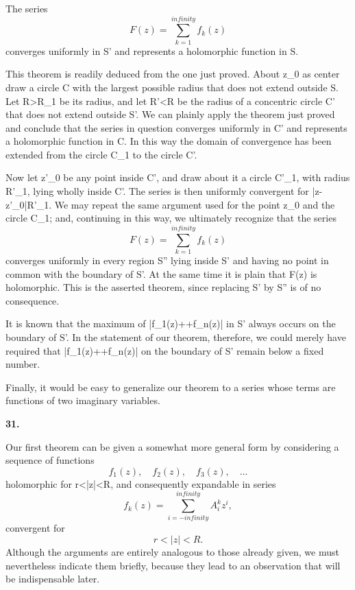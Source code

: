 \documentclass[
  paper=b5,
  fontsize=13pt,
  twoside,
  headings=normal,
  bookmarkpackage=false
]{scrartcl}
\theoremstyle{stieltjesplain}
\theoremstyle{stieltjesdefinition}
\def\({}\def\){}%
\def\infty{infinity}%
\newcommand{\origsection}[1]{%
  \par\addvspace{0.85\baselineskip}%
  \phantomsection\label{sec:#1}%
  \addcontentsline{toc}{subsection}{\texorpdfstring{\S~#1}{Section #1}}%
  \noindent\textbf{#1.}\quad\ignorespaces
}
\begin{document}
\begin{theorem}
The series
\[
 F(z)=\sum_{k=1}^{\infty}f_k(z)
\]
converges uniformly in \(S'\) and represents a holomorphic function in
\(S\).
\end{theorem}

This theorem is readily deduced from the one just proved. About \(z_0\)
as center draw a circle \(C\) with the largest possible radius that does
not extend outside \(S\). Let \(R>R_1\) be its radius, and let
\(R'<R\) be the radius of a concentric circle \(C'\) that does not extend
outside \(S'\). We can plainly apply the theorem just proved and conclude
that the series in question converges uniformly in \(C'\) and represents
a holomorphic function in \(C\). In this way the domain of convergence
has been extended from the circle \(C_1\) to the circle \(C'\).

Now let \(z'_0\) be any point inside \(C'\), and draw about it a circle
\(C'_1\), with radius \(R'_1\), lying wholly inside \(C'\). The series is
then uniformly convergent for \(|z-z'_0|\leq R'_1\). We may repeat the
same argument used for the point \(z_0\) and the circle \(C_1\); and,
continuing in this way, we ultimately recognize that the series
\[
 F(z)=\sum_{k=1}^{\infty}f_k(z)
\]
converges uniformly in every region \(S''\) lying inside \(S'\) and
having no point in common with the boundary of \(S'\). At the same time
it is plain that \(F(z)\) is holomorphic. This is the asserted theorem,
since replacing \(S'\) by \(S''\) is of no consequence.

It is known that the maximum of
\(|f_1(z)+\cdots+f_n(z)|\) in \(S'\) always occurs on the boundary of
\(S'\). In the statement of our theorem, therefore, we could merely have
required that \(|f_1(z)+\cdots+f_n(z)|\) on the boundary of \(S'\)
remain below a fixed number.

Finally, it would be easy to generalize our theorem to a series whose
terms are functions of two imaginary variables.

\origsection{31}
Our first theorem can be given a somewhat more general form by considering
a sequence of functions
\[
 f_1(z),\quad f_2(z),\quad f_3(z),\quad\ldots
\]
holomorphic for \(r<|z|<R\), and consequently expandable in series
\[
 f_k(z)=\sum_{i=-\infty}^{\infty}A_i^kz^i,
\]
convergent for
\[
 r<|z|<R.
\]
Although the arguments are entirely analogous to those already given,
we must nevertheless indicate them briefly, because they lead to an
observation that will be indispensable later.
\end{document}
